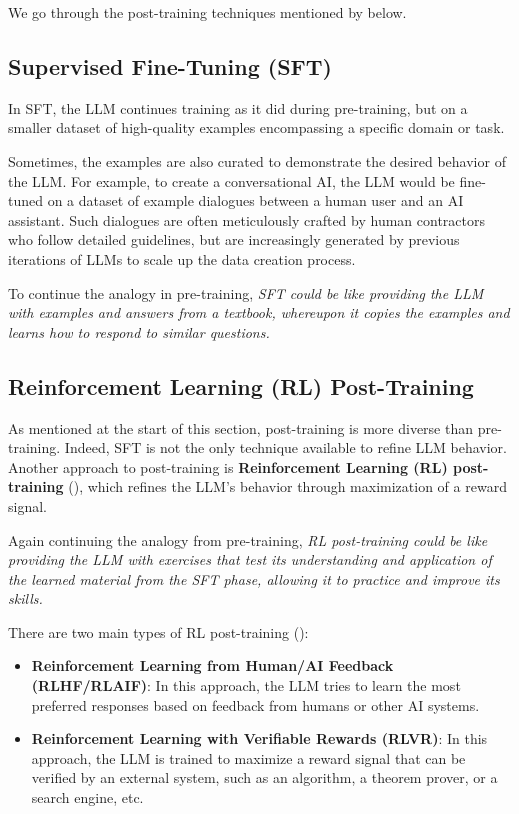 \documentclass{article} %
\begin{document}
We go through the post-training techniques mentioned by \cite{Karpathy-2025} below.

\subsection{Supervised Fine-Tuning (SFT)}

In SFT, the LLM continues training as it did during pre-training,
but on a smaller dataset of high-quality examples encompassing a specific domain or task.

Sometimes, the examples are also curated to demonstrate the desired behavior of the LLM.
For example, to create a conversational AI, the LLM would be fine-tuned on a dataset of 
example dialogues between a human user and an AI assistant. Such dialogues are often
meticulously crafted by human contractors who follow detailed guidelines, but are increasingly
generated by previous iterations of LLMs to scale up the data creation process.

To continue the analogy in pre-training, \textit{
    SFT could be like providing the LLM with examples and answers from a textbook,
    whereupon it copies the examples and learns how to respond to similar questions.
}

\subsection{Reinforcement Learning (RL) Post-Training}

As mentioned at the start of this section, post-training is more diverse than pre-training. 
Indeed, SFT is not the only technique available to refine LLM behavior.
Another approach to post-training is \textbf{Reinforcement Learning (RL) post-training} (\cite{Karpathy-2025}),
which refines the LLM's behavior through maximization of a reward signal.

Again continuing the analogy from pre-training,
\textit{
    RL post-training could be like providing the LLM with exercises
    that test its understanding and application of the learned material
    from the SFT phase, allowing it to practice and improve its skills.
}

There are two main types of RL post-training (\cite{Karpathy-2025}):
\begin{itemize}
    \item \textbf{Reinforcement Learning from Human/AI Feedback (RLHF/RLAIF)}: 
        In this approach, the LLM tries to learn the most preferred responses
        based on feedback from humans or other AI systems.
    \item \textbf{Reinforcement Learning with Verifiable Rewards (RLVR)}:
        In this approach, the LLM is trained to maximize a reward signal that can be verified
        by an external system, such as an algorithm, a theorem prover, or a search engine, etc.
\end{itemize}
\end{document}
